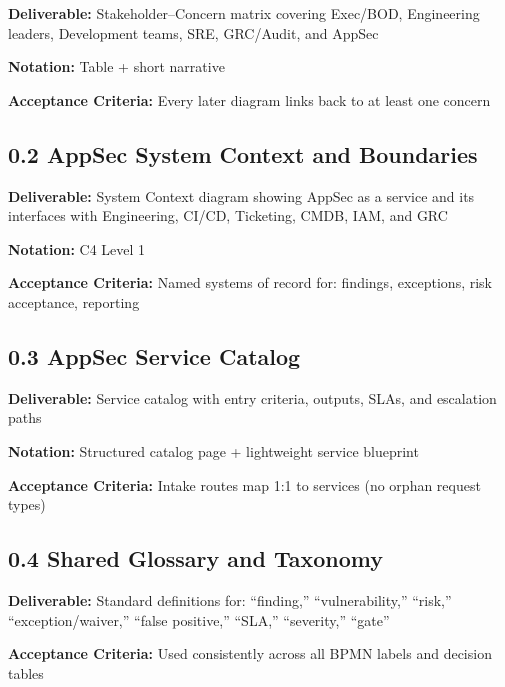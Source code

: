 \documentclass[11pt,letterpaper]{article}
\newcommand{\storyfield}[2]{\textbf{#1:} #2}
\begin{document}
\begin{storycard}
\storyfield{Deliverable}{Stakeholder--Concern matrix covering Exec/BOD, Engineering leaders, Development teams, SRE, GRC/Audit, and AppSec}

\storyfield{Notation}{Table + short narrative}

\storyfield{Acceptance Criteria}{Every later diagram links back to at least one concern}
\end{storycard}

\subsection{0.2 AppSec System Context and Boundaries}

\begin{storycard}
\storyfield{Deliverable}{System Context diagram showing AppSec as a service and its interfaces with Engineering, CI/CD, Ticketing, CMDB, IAM, and GRC}

\storyfield{Notation}{C4 Level 1}

\storyfield{Acceptance Criteria}{Named systems of record for: findings, exceptions, risk acceptance, reporting}
\end{storycard}

\subsection{0.3 AppSec Service Catalog}

\begin{storycard}
\storyfield{Deliverable}{Service catalog with entry criteria, outputs, SLAs, and escalation paths}

\storyfield{Notation}{Structured catalog page + lightweight service blueprint}

\storyfield{Acceptance Criteria}{Intake routes map 1:1 to services (no orphan request types)}
\end{storycard}

\subsection{0.4 Shared Glossary and Taxonomy}

\begin{storycard}
\storyfield{Deliverable}{Standard definitions for: ``finding,'' ``vulnerability,'' ``risk,'' ``exception/waiver,'' ``false positive,'' ``SLA,'' ``severity,'' ``gate''}

\storyfield{Acceptance Criteria}{Used consistently across all BPMN labels and decision tables}
\end{storycard}
\end{document}
